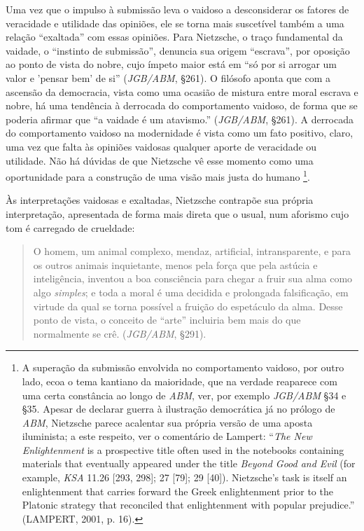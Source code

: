 \documentclass[
	12pt,				%
	openright,			%
	oneside,			%
	a4paper,			%
	english,			%
	french,				%
	spanish,			%
	brazil				%
	]{abntex2}
\begin{document}
Uma vez que o impulso à submissão leva o vaidoso a desconsiderar os fatores de veracidade e utilidade das opiniões, ele se torna mais suscetível também a uma relação “exaltada” com essas opiniões. Para Nietzsche, o traço fundamental da vaidade, o “instinto de submissão”, denuncia sua origem “escrava”, por oposição ao ponto de vista do nobre, cujo ímpeto maior está em “só por si arrogar um valor e 'pensar bem' de si” (\textit{JGB/ABM}, §261). O filósofo aponta que com a ascensão da democracia, vista como uma ocasião de mistura entre moral escrava e nobre, há uma tendência à derrocada do comportamento vaidoso, de forma que se poderia afirmar que “a vaidade é um atavismo.” (\textit{JGB/ABM}, §261). A derrocada do comportamento vaidoso na modernidade é vista como um fato positivo, claro, uma vez que falta às opiniões vaidosas qualquer aporte de veracidade ou utilidade. Não há dúvidas de que Nietzsche vê esse momento como uma oportunidade para a construção de uma visão mais justa do humano
\footnote{A superação da submissão envolvida no comportamento vaidoso, por outro lado, ecoa o tema kantiano da maioridade, que na verdade reaparece com uma certa constância ao longo de \textit{ABM}, ver, por exemplo \textit{JGB/ABM} §34 e §35. Apesar de declarar guerra à ilustração democrática já no prólogo de \textit{ABM}, Nietzsche parece acalentar sua própria versão de uma aposta iluminista; a este respeito, ver o comentário de Lampert: “\textit{The New Enlightenment} is a prospective title often used in the notebooks containing materials that eventually appeared under the title \textit{Beyond Good and Evil} (for example, \textit{KSA} 11.26 [293, 298]; 27 [79]; 29 [40]). Nietzsche’s task is itself an enlightenment that carries forward the Greek enlightenment prior to the Platonic strategy that reconciled that enlightenment with popular prejudice.” (LAMPERT, 2001, p. 16).}.

	Às interpretações vaidosas e exaltadas, Nietzsche contrapõe sua própria interpretação, apresentada de forma mais direta que o usual, num aforismo cujo tom é carregado de crueldade:

\begin{quotation}
O homem, um animal complexo, mendaz, artificial, intransparente, e para os outros animais inquietante, menos pela força que pela astúcia e inteligência, inventou a boa consciência para chegar a fruir sua alma como algo \textit{simples}; e toda a moral é uma decidida e prolongada falsificação, em virtude da qual se torna possível a fruição do espetáculo da alma. Desse ponto de vista, o conceito de “arte” incluiria bem mais do que normalmente se crê. (\textit{JGB/ABM}, §291). 
\end{quotation}
\end{document}
